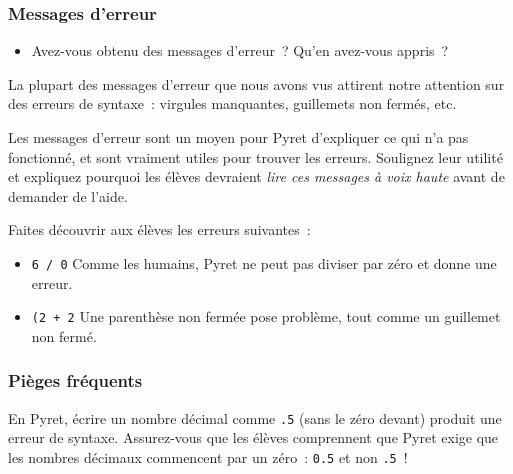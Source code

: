 \documentclass[12pt,a4paper]{article}
\newcommand{\pyret}[1]{\texttt{#1}}
\begin{document}
\subsubsection{Messages d'erreur}

\begin{activitybox}
  \begin{itemize}
    \item Avez-vous obtenu des messages d'erreur~? Qu'en avez-vous appris~?
  \end{itemize}
\end{activitybox}

\begin{instructornotes}
  La plupart des messages d'erreur que nous avons vus attirent notre attention sur des erreurs de syntaxe~: virgules manquantes, guillemets non fermés, etc.

  Les messages d'erreur sont un moyen pour Pyret d'expliquer ce qui n'a pas fonctionné, et sont vraiment utiles pour trouver les erreurs. Soulignez leur utilité et expliquez pourquoi les élèves devraient \emph{lire ces messages à voix haute} avant de demander de l'aide.
\end{instructornotes}

Faites découvrir aux élèves les erreurs suivantes~:

\begin{errorbox}
  \begin{itemize}[leftmargin=*]
    \item \pyret{6 / 0} \hspace{2em} Comme les humains, Pyret ne peut pas diviser par zéro et donne une erreur.
    \item \pyret{(2 + 2} \hspace{2em} Une parenthèse non fermée pose problème, tout comme un guillemet non fermé.
  \end{itemize}
\end{errorbox}

\subsubsection{Pièges fréquents}

\begin{instructornotes}
  En Pyret, écrire un nombre décimal comme \texttt{.5} (sans le zéro devant) produit une erreur de syntaxe. Assurez-vous que les élèves comprennent que Pyret exige que les nombres décimaux commencent par un zéro~: \texttt{0.5} et non \texttt{.5}~!
\end{instructornotes}
\end{document}
